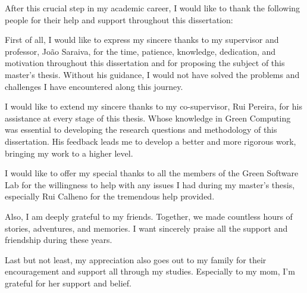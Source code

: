 \acknowledgements


After this crucial step in my academic career, I would like to thank the following people for their help and support throughout this dissertation:

First of all, I would like to express my sincere thanks to my supervisor and professor, João Saraiva, for the time, patience, knowledge, dedication, and motivation throughout this dissertation and for proposing the subject of this master's thesis. Without his guidance, I would not have solved the problems and challenges I have encountered along this journey.

I would like to extend my sincere thanks to my co-supervisor, Rui Pereira, for his assistance at every stage of this thesis. Whose knowledge in  Green Computing was essential to developing the research questions and methodology of this dissertation. His feedback leads me to develop a better and more rigorous work, bringing my work to a higher level.

I would like to offer my special thanks to all the members of the Green Software Lab for the willingness to help with any issues I had during my master's thesis, especially Rui Calheno for the tremendous help provided.  

Also, I am deeply grateful to my friends. Together, we made countless hours of stories, adventures, and memories. I want sincerely praise all the support and friendship during these years.

Last but not least, my appreciation also goes out to my family for their encouragement and support all through my studies. Especially to my mom, I'm grateful for her support and belief.
